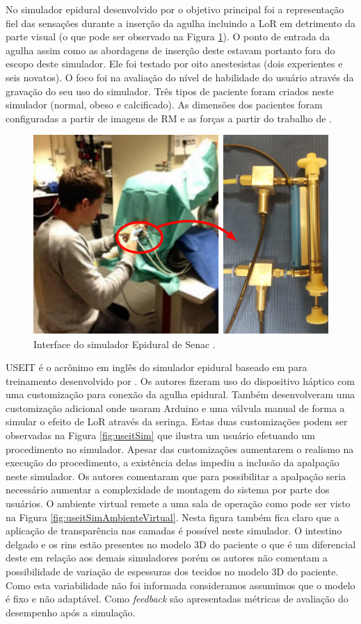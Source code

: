 No simulador epidural desenvolvido por \textcite{Senac2019} o objetivo principal foi a representação fiel das sensações durante a inserção da agulha incluindo a \acrshort{LoR} em detrimento da parte visual (o que pode ser observado na Figura \ref{fig:senacSim}). O ponto de entrada da agulha assim como as abordagens de inserção deste estavam portanto fora do escopo deste simulador. Ele foi testado por oito anestesistas (dois experientes e seis novatos). O foco foi na avaliação do nível de habilidade do usuário através da gravação do seu uso do simulador. Três tipos de paciente foram criados neste simulador (normal, obeso e calcificado). As dimensões dos pacientes foram configuradas a partir de imagens de \acrshort{RM} e as forças a partir do trabalho de \textcite{Tran2009}.

\begin{figure}[ht!]
    \centering
    \includegraphics[width=0.6\linewidth]{capitulos/figuras/Senac-ES.png} 
    \caption{Interface do simulador Epidural de Senac \cite{Senac2019}.}
    \label{fig:senacSim}
\end{figure}

USEIT é o acrônimo em inglês do simulador epidural baseado em  para treinamento desenvolvido por . Os autores fizeram uso do dispositivo háptico  com uma customização para conexão da agulha epidural. Também desenvolveram uma customização adicional onde usaram Arduino e uma válvula manual de forma a simular o efeito de \acrshort{LoR} através da seringa. Estas duas customizações podem ser observadas na Figura \ref{fig:useitSim} que ilustra um usuário efetuando um procedimento no simulador. Apesar das customizações aumentarem o realismo na execução do procedimento, a existência delas impediu a inclusão da apalpação neste simulador. Os autores comentaram que para possibilitar a apalpação seria necessário aumentar a complexidade de montagem do sistema por parte dos usuários. O ambiente virtual remete a uma sala de operação como pode ser visto na Figura \ref{fig:useitSimAmbienteVirtual}. Nesta figura também fica claro que a aplicação de transparência nas camadas é possível neste simulador. O intestino delgado e os rins estão presentes no modelo 3D do paciente o que é um diferencial deste em relação aos demais simuladores porém os autores não comentam a possibilidade de variação de espessuras dos tecidos no modelo 3D do paciente. Como esta variabilidade não foi informada consideramos assumimos que o modelo é fixo e não adaptável. Como \textit{feedback} são apresentadas métricas de avaliação do desempenho após a simulação.

